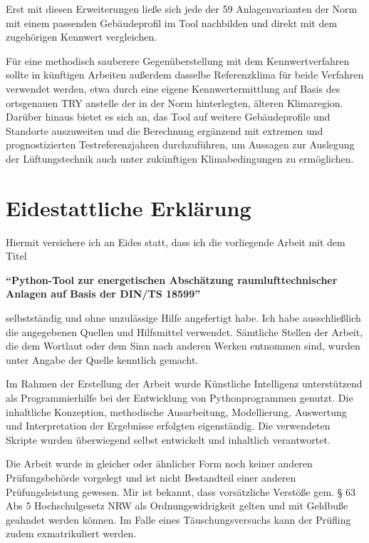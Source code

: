 \documentclass{scrreprt}
\begin{document}
Erst mit diesen Erweiterungen ließe sich jede der 59 Anlagenvarianten
der Norm mit einem passenden Gebäudeprofil im Tool nachbilden und
direkt mit dem zugehörigen Kennwert vergleichen.

Für eine methodisch sauberere Gegenüberstellung mit dem
Kennwertverfahren sollte in künftigen Arbeiten außerdem dasselbe
Referenzklima für beide Verfahren verwendet werden, etwa durch eine
eigene Kennwertermittlung auf Basis des ortsgenauen \ac{TRY} anstelle
der in der Norm hinterlegten, älteren Klimaregion. Darüber hinaus
bietet es sich an, das Tool auf weitere Gebäudeprofile und Standorte
auszuweiten und die Berechnung ergänzend mit extremen und
prognostizierten Testreferenzjahren durchzuführen, um Aussagen zur
Auslegung der Lüftungstechnik auch unter zukünftigen
Klimabedingungen zu ermöglichen.

\printbibliography
\chapter*{Eidestattliche Erklärung}
 
Hiermit versichere ich an Eides statt, dass ich die vorliegende Arbeit mit dem Titel
 
\large\textbf{\enquote{Python-Tool zur energetischen Abschätzung raumlufttechnischer Anlagen auf Basis der DIN/TS 18599}}
 
selbstständig und ohne unzulässige Hilfe angefertigt habe. Ich habe ausschließlich die angegebenen Quellen und Hilfsmittel verwendet. Sämtliche Stellen der Arbeit, die dem Wortlaut oder dem Sinn nach anderen Werken entnommen sind, wurden unter Angabe der Quelle kenntlich gemacht.

Im Rahmen der Erstellung der Arbeit wurde Künstliche Intelligenz unterstützend als Programmierhilfe bei der Entwicklung von Pythonprogrammen genutzt. Die inhaltliche Konzeption, methodische Ausarbeitung, Modellierung, Auswertung und Interpretation der Ergebnisse erfolgten eigenständig. Die verwendeten Skripte wurden überwiegend selbst entwickelt und inhaltlich verantwortet.
 
Die Arbeit wurde in gleicher oder ähnlicher Form noch keiner anderen Prüfungsbehörde vorgelegt und ist nicht Bestandteil einer anderen Prüfungsleistung gewesen. Mir ist bekannt, dass vorsätzliche Verstöße gem. § 63 Abs 5 Hochschulgesetz NRW als Ordnungswidrigkeit gelten und mit Geldbuße geahndet werden können. Im Falle eines Täuschungsversuchs kann der Prüfling zudem exmatrikuliert werden.
 
\end{document}
